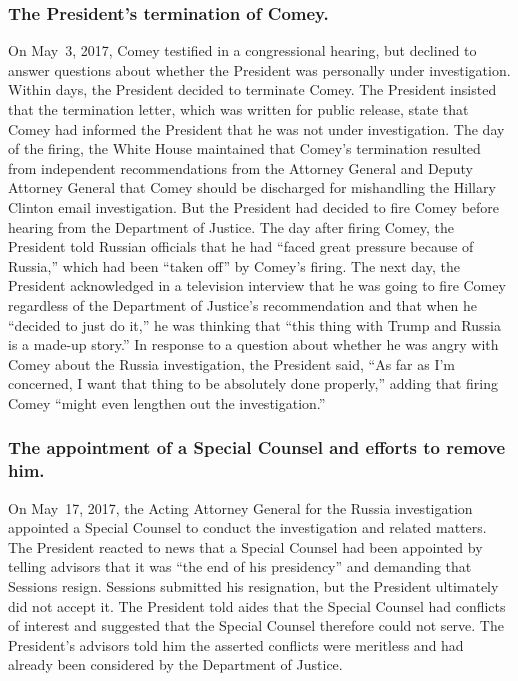\subsubsection*{The President's termination of Comey.}

On May~3, 2017, Comey testified in a congressional hearing, but declined to answer questions about whether the President was personally under investigation.
Within days, the President decided to terminate Comey.
The President insisted that the termination letter, which was written for public release, state that Comey had informed the President that he was not under investigation.
The day of the firing, the White House maintained that Comey's termination resulted from independent recommendations from the Attorney General and Deputy Attorney General that Comey should be discharged for mishandling the Hillary Clinton email investigation.
But the President had decided to fire Comey before hearing from the Department of Justice.
The day after firing Comey, the President told Russian officials that he had ``faced great pressure because of Russia,'' which had been ``taken off\thinspace'' by Comey's firing.
The next day, the President acknowledged in a television interview that he was going to fire Comey regardless of the Department of Justice's recommendation and that when he ``decided to just do it,'' he was thinking that ``this thing with Trump and Russia is a made-up story.''
In response to a question about whether he was angry with Comey about the Russia investigation, the President said, ``As far as I'm concerned, I want that thing to be absolutely done properly,'' adding that firing Comey ``might even lengthen out the investigation.''

\subsubsection*{The appointment of a Special Counsel and efforts to remove him.}

On May~17, 2017, the Acting Attorney General for the Russia investigation appointed a Special Counsel to conduct the investigation and related matters.
The President reacted to news that a Special Counsel had been appointed by telling advisors that it was ``the end of his presidency'' and demanding that Sessions resign.
Sessions submitted his resignation, but the President ultimately did not accept it.
The President told aides that the Special Counsel had conflicts of interest and suggested that the Special Counsel therefore could not serve.
The President's advisors told him the asserted conflicts were meritless and had already been considered by the Department of Justice.


